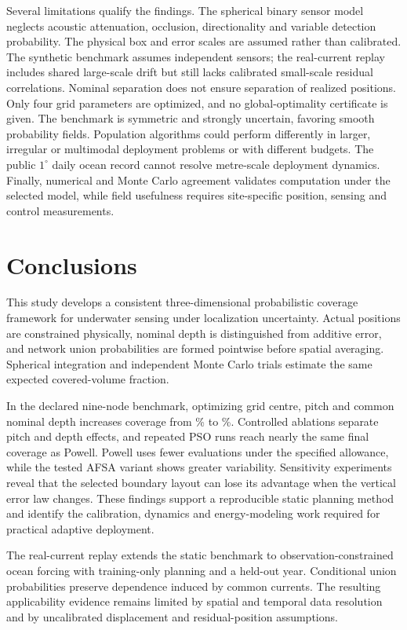 \documentclass[fleqn,10pt]{wlscirep}
\begin{document}
Several limitations qualify the findings. The spherical binary sensor model neglects acoustic attenuation, occlusion, directionality and variable detection probability. The physical box and error scales are assumed rather than calibrated. The synthetic benchmark assumes independent sensors; the real-current replay includes shared large-scale drift but still lacks calibrated small-scale residual correlations. Nominal separation does not ensure separation of realized positions. Only four grid parameters are optimized, and no global-optimality certificate is given. The benchmark is symmetric and strongly uncertain, favoring smooth probability fields. Population algorithms could perform differently in larger, irregular or multimodal deployment problems or with different budgets. The public $1^\circ$ daily ocean record cannot resolve metre-scale deployment dynamics. Finally, numerical and Monte Carlo agreement validates computation under the selected model, while field usefulness requires site-specific position, sensing and control measurements.

\section*{Conclusions}
This study develops a consistent three-dimensional probabilistic coverage framework for underwater sensing under localization uncertainty. Actual positions are constrained physically, nominal depth is distinguished from additive error, and network union probabilities are formed pointwise before spatial averaging. Spherical integration and independent Monte Carlo trials estimate the same expected covered-volume fraction.

In the declared nine-node benchmark, optimizing grid centre, pitch and common nominal depth increases coverage from \FixedCov\% to \OptCov\%. Controlled ablations separate pitch and depth effects, and repeated PSO runs reach nearly the same final coverage as Powell. Powell uses fewer evaluations under the specified allowance, while the tested AFSA variant shows greater variability. Sensitivity experiments reveal that the selected boundary layout can lose its advantage when the vertical error law changes. These findings support a reproducible static planning method and identify the calibration, dynamics and energy-modeling work required for practical adaptive deployment.

The real-current replay extends the static benchmark to observation-constrained ocean forcing with training-only planning and a held-out year. Conditional union probabilities preserve dependence induced by common currents. The resulting applicability evidence remains limited by spatial and temporal data resolution and by uncalibrated displacement and residual-position assumptions.
\end{document}
